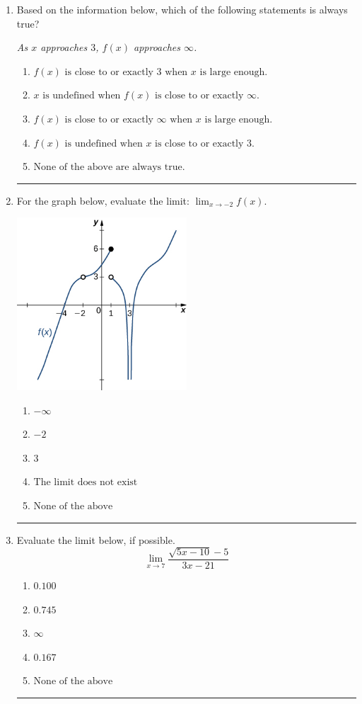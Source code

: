 \documentclass[14pt]{extbook}
\newcommand{\litem}[1]{\item#1\hspace*{-1cm}\rule{\textwidth}{0.4pt}}
\begin{document}
\begin{enumerate}
{\begin{enumerate}[label=\Alph*.]
\end{enumerate} }
\litem{
Based on the information below, which of the following statements is always true?
\begin{center}
    \textit{ As $x$ approaches $3$, $f(x)$ approaches $\infty$. }
\end{center}
\begin{enumerate}[label=\Alph*.]
\item \( f(x) \text{ is close to or exactly } 3 \text{ when } x \text{ is large enough}. \)
\item \( x \text{ is undefined when } f(x) \text{ is close to or exactly } \infty. \)
\item \( f(x) \text{ is close to or exactly } \infty \text{ when } x \text{ is large enough}. \)
\item \( f(x) \text{ is undefined when } x \text{ is close to or exactly } 3. \)
\item \( \text{None of the above are always true.} \)

\end{enumerate} }
\litem{
For the graph below, evaluate the limit: $ \displaystyle \lim_{x \rightarrow -2} f(x)$.
\begin{center}
    \includegraphics[width=0.5\textwidth]{../Figures/evaluateLimitGraphicallyC.png}
\end{center}
\begin{enumerate}[label=\Alph*.]
\item \( -\infty \)
\item \( -2 \)
\item \( 3 \)
\item \( \text{The limit does not exist} \)
\item \( \text{None of the above} \)

\end{enumerate} }
\litem{
Evaluate the limit below, if possible.\[ \lim_{x \rightarrow 7} \frac{\sqrt{5x - 10} - 5}{3x - 21} \]\begin{enumerate}[label=\Alph*.]
\item \( 0.100 \)
\item \( 0.745 \)
\item \( \infty \)
\item \( 0.167 \)
\item \( \text{None of the above} \)


\end{enumerate}}
\end{enumerate}
\end{document}
